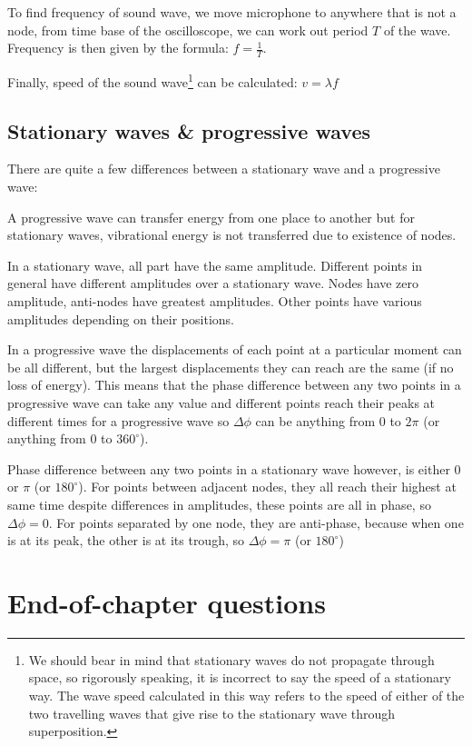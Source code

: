 \documentclass[a4paper,12pt]{book}
\newcounter{question}[chapter]
\begin{document}
To find frequency of sound wave, we move microphone to anywhere that is not a node, from time base of the oscilloscope, we can work out period $T$ of the wave. Frequency is then given by the formula: $f=\frac{1}{T}$.

Finally,  speed of the sound wave\footnote{We should bear in mind that stationary waves do not propagate through space, so rigorously speaking, it is incorrect to say the speed of a stationary way. The wave speed calculated in this way refers to the speed of either of the two travelling waves that give rise to the stationary wave through superposition.} can be calculated: $v=\lambda f$

\subsection{Stationary waves \& progressive waves}

There are quite a few differences between a stationary wave and a progressive wave:

A progressive wave can transfer energy from one place to another but for stationary waves, vibrational energy is not transferred due to existence of nodes. 

In a stationary wave, all part have the same amplitude. Different points in general have different amplitudes over a stationary wave. Nodes have zero amplitude, anti-nodes have greatest amplitudes. Other points have various amplitudes depending on their positions.

In a progressive wave the displacements of each point at a particular moment can be all different, but the largest displacements they can reach are the same (if no loss of energy). This means that the phase difference between any two points in a progressive wave can take any value and different points reach their peaks at different times for a progressive wave so $\Delta \phi$ can be anything from 0 to $2\pi$ (or anything from 0 to $360^\circ$).

Phase difference between any two points in a stationary wave however, is either 0 or $\pi$ (or $180^\circ$). For points between adjacent nodes, they all reach their highest at same time despite differences in amplitudes, these points are all in phase, so $\Delta \phi=0$.
For points separated by one node, they are anti-phase, because when one is at its peak, the other is at its trough, so $\Delta \phi = \pi$ (or $180^\circ$)

	
\section{End-of-chapter questions}
\end{document}
